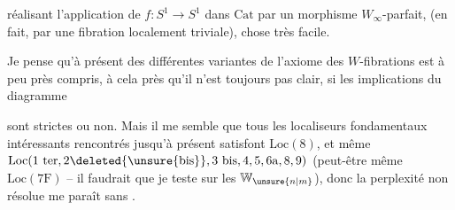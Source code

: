
réalisant l'application de  $f:S^1\longrightarrow S^1$ dans $\mathrm{Cat}$ par un morphisme $W_\infty$-parfait, (en fait, par une  fibration localement triviale), chose très facile.


Je pense qu'à présent  des différentes variantes de l'axiome des $W$-fibrations est à peu près compris, à cela près qu'il n'est toujours pas clair,  si les implications du diagramme

sont strictes ou non. Mais il me semble que tous les localiseurs fondamentaux intéressants rencontrés jusqu'à présent satisfont $\mathrm{Loc}(8)$, et même $\mathrm{Loc}(1\ \mathrm{ter},2\deleted{\unsure{\mathrm{bis}}},3\ \mathrm{bis},4,5,6\mathrm a,8,9)$ (peut-être même $\mathrm{Loc}(7\mathrm F)$ -- il  faudrait que je teste sur les $\mathbb W_{\unsure{n|m}}$), donc la perplexité non résolue me paraît sans .
